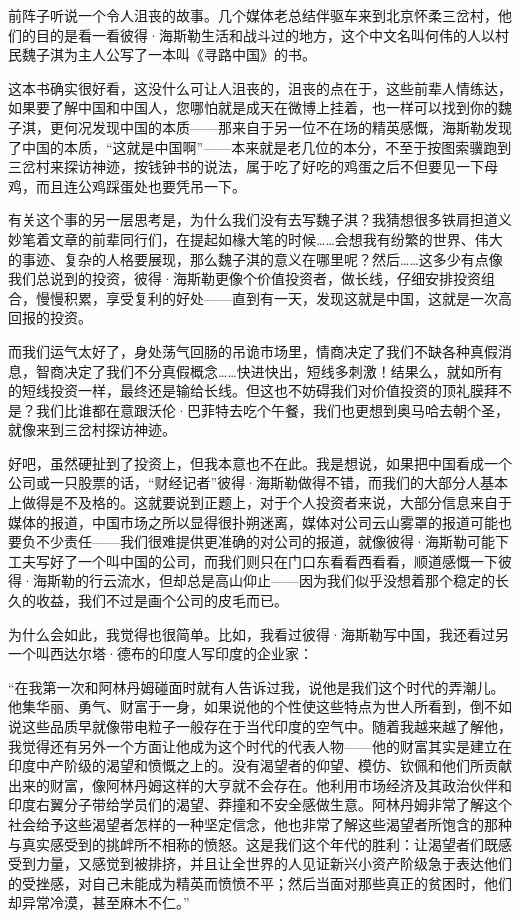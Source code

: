 前阵子听说一个令人沮丧的故事。几个媒体老总结伴驱车来到北京怀柔三岔村，他们的目的是看一看彼得·海斯勒生活和战斗过的地方，这个中文名叫何伟的人以村民魏子淇为主人公写了一本叫《寻路中国》的书。

这本书确实很好看，这没什么可让人沮丧的，沮丧的点在于，这些前辈人情练达，如果要了解中国和中国人，您哪怕就是成天在微博上挂着，也一样可以找到你的魏子淇，更何况发现中国的本质------那来自于另一位不在场的精英感慨，海斯勒发现了中国的本质，``这就是中国啊''------本来就是老几位的本分，不至于按图索骥跑到三岔村来探访神迹，按钱钟书的说法，属于吃了好吃的鸡蛋之后不但要见一下母鸡，而且连公鸡踩蛋处也要凭吊一下。

有关这个事的另一层思考是，为什么我们没有去写魏子淇？我猜想很多铁肩担道义妙笔着文章的前辈同行们，在提起如椽大笔的时候\ldots\ldots 会想我有纷繁的世界、伟大的事迹、复杂的人格要展现，那么魏子淇的意义在哪里呢？然后\ldots\ldots 这多少有点像我们总说到的投资，彼得·海斯勒更像个价值投资者，做长线，仔细安排投资组合，慢慢积累，享受复利的好处------直到有一天，发现这就是中国，这就是一次高回报的投资。

而我们运气太好了，身处荡气回肠的吊诡市场里，情商决定了我们不缺各种真假消息，智商决定了我们不分真假概念\ldots\ldots 快进快出，短线多刺激！结果么，就如所有的短线投资一样，最终还是输给长线。但这也不妨碍我们对价值投资的顶礼膜拜不是？我们比谁都在意跟沃伦·巴菲特去吃个午餐，我们也更想到奥马哈去朝个圣，就像来到三岔村探访神迹。

好吧，虽然硬扯到了投资上，但我本意也不在此。我是想说，如果把中国看成一个公司或一只股票的话，``财经记者''彼得·海斯勒做得不错，而我们的大部分人基本上做得是不及格的。这就要说到正题上，对于个人投资者来说，大部分信息来自于媒体的报道，中国市场之所以显得很扑朔迷离，媒体对公司云山雾罩的报道可能也要负不少责任------我们很难提供更准确的对公司的报道，就像彼得·海斯勒可能下工夫写好了一个叫中国的公司，而我们则只在门口东看看西看看，顺道感慨一下彼得·海斯勒的行云流水，但却总是高山仰止------因为我们似乎没想着那个稳定的长久的收益，我们不过是画个公司的皮毛而已。

为什么会如此，我觉得也很简单。比如，我看过彼得·海斯勒写中国，我还看过另一个叫西达尔塔·德布的印度人写印度的企业家：

``在我第一次和阿林丹姆碰面时就有人告诉过我，说他是我们这个时代的弄潮儿。他集华丽、勇气、财富于一身，如果说他的个性使这些特点为世人所看到，倒不如说这些品质早就像带电粒子一般存在于当代印度的空气中。随着我越来越了解他，我觉得还有另外一个方面让他成为这个时代的代表人物------他的财富其实是建立在印度中产阶级的渴望和愤慨之上的。没有渴望者的仰望、模仿、钦佩和他们所贡献出来的财富，像阿林丹姆这样的大亨就不会存在。他利用市场经济及其政治伙伴和印度右翼分子带给学员们的渴望、莽撞和不安全感做生意。阿林丹姆非常了解这个社会给予这些渴望者怎样的一种坚定信念，他也非常了解这些渴望者所饱含的那种与真实感受到的挑衅所不相称的愤怒。这是我们这个年代的胜利：让渴望者们既感受到力量，又感觉到被排挤，并且让全世界的人见证新兴小资产阶级急于表达他们的受挫感，对自己未能成为精英而愤愤不平；然后当面对那些真正的贫困时，他们却异常冷漠，甚至麻木不仁。''

